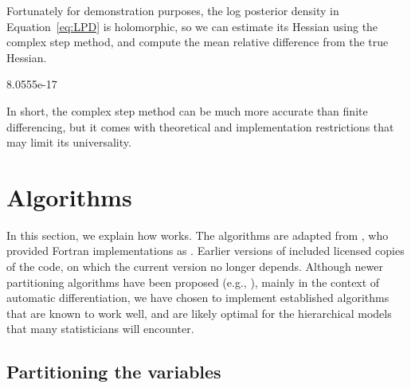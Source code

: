 \documentclass[jss]{jss}\usepackage[]{graphicx}\usepackage[]{color}
\begin{document}
Fortunately for demonstration purposes, the log posterior density in Equation~\ref{eq:LPD} is holomorphic, so we
can estimate its Hessian using the complex step method, and compute
the mean relative difference from the true Hessian.

\begin{Schunk}
\begin{Soutput}
[1] 8.0555e-17
\end{Soutput}
\end{Schunk}



In short, the complex step method can be much more accurate than
finite differencing, but it comes with theoretical and implementation
restrictions that may limit its universality.



\section[Algorithms]{Algorithms}\label{sec:algorithms}

In this section, we explain how  works. The
algorithms are adapted from \citet{ColemanGarbow1985}, who provided
Fortran implementations as \citet{ColemanGarbow1985b}.  Earlier
versions of  included licensed copies of the
\citet{ColemanGarbow1985b} code, on which the current version no
longer depends. Although newer partitioning algorithms have been proposed (e.g.,
\citealp{GebremedhinManne2005,GebremedhinTarafdar2009}), mainly in the
context of automatic differentiation, we have chosen to implement
established algorithms that are known to work well, and are likely
optimal for the hierarchical models that many statisticians will encounter.


\subsection[Partitioning the variables]{Partitioning the variables}\label{sec:coloring}
\end{document}
